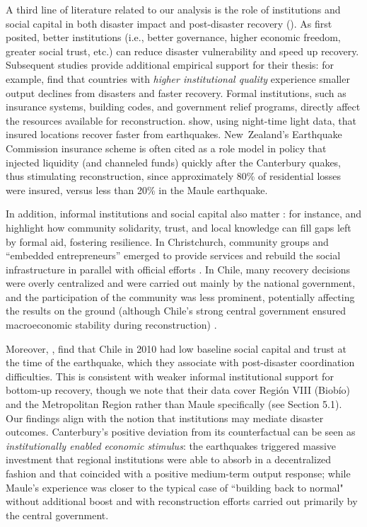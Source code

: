 \documentclass[12pt]{article}
\begin{document}
A third line of literature related to our analysis is the role of institutions and social capital in both disaster impact and post-disaster recovery (\cite{rayamajhee2024shock, storr2016community, dussaillant2014trust}). As \textcite{skidmore2002does} first posited, better institutions (i.e., better governance, higher economic freedom, greater social trust, etc.) can reduce disaster vulnerability and speed up recovery. Subsequent studies provide additional empirical support for their thesis: for example, \textcite{raschky2008institutions, barone2014natural} find that countries with \textit{higher institutional quality} experience smaller output declines from disasters and faster recovery. Formal institutions, such as insurance systems, building codes, and government relief programs, directly affect the resources available for reconstruction. \textcite{nguyen2020insurance} show, using night-time light data, that insured locations recover faster from earthquakes. New Zealand’s Earthquake Commission insurance scheme is often cited as a role model in policy that injected liquidity (and channeled funds) quickly after the Canterbury quakes, thus stimulating reconstruction, since approximately 80\% of residential losses were insured, versus less than 20\% in the Maule earthquake. 

In addition, informal institutions and social capital also matter \parencite{storr2016community}: for instance, \textcite{storr2017sandy} and \textcite{aldrich2015social} highlight how community solidarity, trust, and local knowledge can fill gaps left by formal aid, fostering resilience. In Christchurch, community groups and “embedded entrepreneurs” emerged to provide services and rebuild the social infrastructure in parallel with official efforts \autocite{GrubeStorr2018}. In Chile, many recovery decisions were overly centralized and were carried out mainly by the national government, and the participation of the community was less prominent, potentially affecting the results on the ground (although Chile's strong central government ensured macroeconomic stability during reconstruction) \parencite{cardenasjiron2012chilean}. 

Moreover, \textcite{dussaillant2014trust}, find that Chile in 2010 had low baseline social capital and trust at the time of the earthquake, which they associate with post-disaster coordination difficulties. This is consistent with weaker informal institutional support for bottom-up recovery, though we note that their data cover Región VIII (Biobío) and the Metropolitan Region rather than Maule specifically (see Section 5.1). Our findings align with the notion that institutions may mediate disaster outcomes. Canterbury’s positive deviation from its counterfactual can be seen as \emph{institutionally enabled economic stimulus}: the earthquakes triggered massive investment that regional institutions were able to absorb in a decentralized fashion and that coincided with a positive medium-term output response; while Maule's experience was closer to the typical case of “building back to normal" without additional boost and with reconstruction efforts carried out primarily by the central government.
\end{document}
